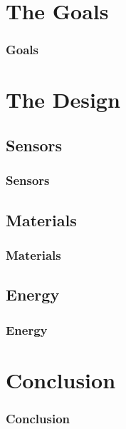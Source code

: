 \documentclass[12pt]{beamer}
\author{}
\title{}
\subtitle{}
\date{\today}
\begin{document}

    \maketitle

    \section{The Goals}
        \begin{frame}
            \frametitle{Goals}
        \end{frame}

    \section{The Design}
        \subsection{Sensors} %
            \begin{frame}
                \frametitle{Sensors}
            \end{frame}
        \subsection{Materials}
            \begin{frame}
                \frametitle{Materials}
            \end{frame}
        \subsection{Energy} %
            \begin{frame}
                \frametitle{Energy}
            \end{frame}

    \section{Conclusion} %
        \begin{frame}
            \frametitle{Conclusion}
        \end{frame}
\end{document}
